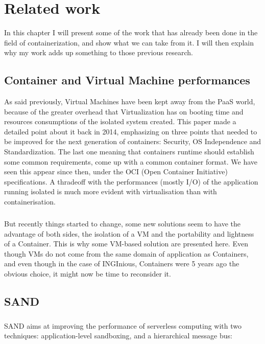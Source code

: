 \chapter{Related work}

In this chapter I will present some of the work that has already been done in the field of containerization, and show what we can take from it.  I will then explain why my work adds up something to those previous research.

\section{Container and Virtual Machine performances}
As said previously, Virtual Machines have been kept away from the PaaS world, because of the greater overhead that Virtualization has on booting time and resources consumptions of the isolated system created.  This paper \cite{dua2014virtualization} made a detailed point about it back in 2014, emphasizing on three points that needed to be improved for the next generation of containers: Security, OS Independence and Standardization.  The last one meaning that containers runtime should establish some common requirements, come up with a common container format.  We have seen this appear since then, under the OCI (Open Container Initiative) specifications.  A thradeoff with the performances (mostly I/O) of the application running isolated is much more evident with virtualisation than with containerisation\cite{felter2015updated}.

\paragraph{}But recently things started to change, some new solutions seem to have the advantage of both sides, the isolation of a VM and the portability and lightness of a Container.  This is why some VM-based solution are presented here.  Even though VMs do not come from the same domain of application as Containers, and even though in the case of INGInious, Containers were 5 years ago the obvious choice, it might now be time to reconsider it.

\section{SAND} 
\paragraph{}SAND\cite{akkus2018sand} aims at improving the performance of serverless computing with two techniques: application-level sandboxing, and a hierarchical message bus:

